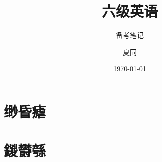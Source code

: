 ﻿\documentclass[lang=cn,11pt]{elegantbook}
\title{六级英语}
\subtitle{备考笔记}
\author{夏同}
\institute{华南理工大学}
\date{\today}
\begin{document}
\maketitle
\frontmatter
\tableofcontents
\mainmatter
\chapter{缈昏瘧}
\chapter{鍐欎綔}



\end{document}
